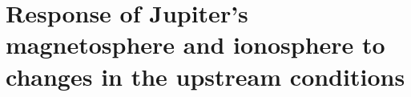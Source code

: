 
\chapter{Response of Jupiter's magnetosphere and ionosphere to changes in the upstream conditions}

